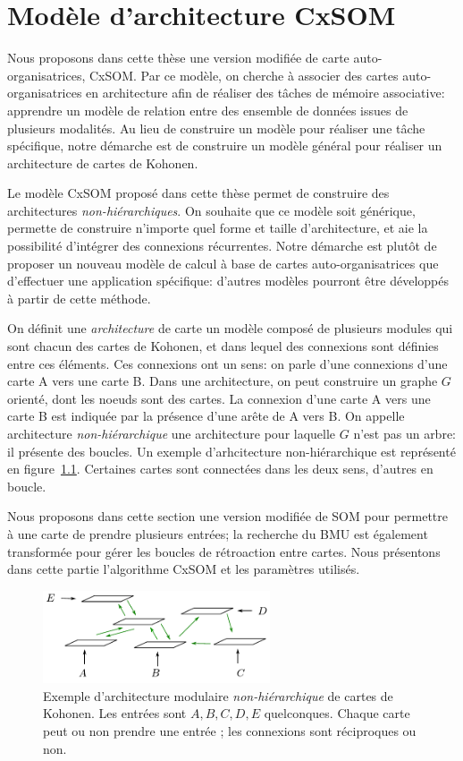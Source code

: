 \chapter{Modèle d'architecture CxSOM}
\graphicspath{{02-SOM/}}
\minitoc
Nous proposons dans cette thèse une version modifiée de carte auto-organisatrices, CxSOM. Par ce modèle, on cherche à associer des cartes auto-organisatrices en architecture afin de réaliser des tâches de mémoire associative: apprendre un modèle de relation entre des ensemble de données issues de plusieurs modalités. Au lieu de construire un modèle pour réaliser une tâche spécifique,  notre démarche est de construire un modèle général pour réaliser un architecture de cartes de Kohonen. 

Le modèle CxSOM proposé dans cette thèse permet de construire des architectures \emph{non-hiérarchiques}. On souhaite que ce modèle soit générique, permette de construire n'importe quel forme et taille d'architecture, et aie la possibilité d'intégrer des connexions récurrentes. Notre démarche est plutôt de proposer un nouveau modèle de calcul à base de cartes auto-organisatrices que d'effectuer une application spécifique: d'autres modèles pourront être développés à partir de cette méthode.

On définit une \emph{architecture} de carte un modèle composé de plusieurs modules qui sont chacun des cartes de Kohonen, et dans lequel des connexions sont définies entre ces éléments. Ces connexions ont un sens: on parle d'une connexions d'une carte A vers une carte B.
Dans une architecture, on peut construire un graphe $G$ orienté, dont les noeuds sont des cartes. La connexion d'une carte A vers une carte B est indiquée par la présence d'une arête de A vers B. On appelle architecture \emph{non-hiérarchique} une architecture pour laquelle $G$ n'est pas un arbre: il présente des boucles. Un exemple d'arhcitecture non-hiérarchique est représenté en figure~\ref{fig:archi_non_hierarchique}. Certaines cartes sont connectées dans les deux sens, d'autres en boucle.

Nous proposons dans cette section une version modifiée de SOM pour permettre à une carte de prendre plusieurs entrées; la recherche du BMU est également transformée pour gérer les boucles de rétroaction entre cartes.
Nous présentons dans cette partie l'algorithme CxSOM et les paramètres utilisés.


\begin{figure}
\centering
\includegraphics[width=0.6\textwidth]{architecture.pdf}
\caption{Exemple d'architecture modulaire \emph{non-hiérarchique} de cartes de Kohonen. Les entrées sont $A,B,C,D,E$ quelconques. Chaque carte peut ou non prendre une entrée ; les connexions sont réciproques ou non.}
\label{fig:archi_non_hierarchique}
\end{figure}


